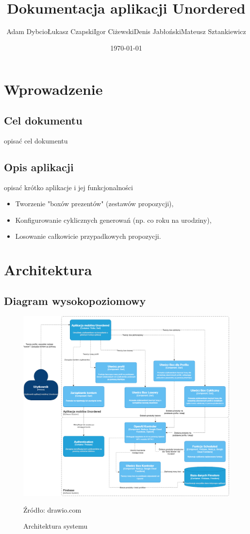 \documentclass[a4paper, 12pt]{article}
\title{Dokumentacja aplikacji Unordered}
\author{Adam Dybcio\endline Łukasz Czapski\endline Igor Ciżewski\endline Denis Jabłoński\endline Mateusz Sztankiewicz}
\date{\today}
\begin{document}
\maketitle
\newpage
\tableofcontents
\newpage

\section{Wprowadzenie}
\subsection{Cel dokumentu}
opisać cel dokumentu

\subsection{Opis aplikacji}
opisać krótko aplikacje i jej funkcjonalności
\begin{itemize}
    \item Tworzenie "boxów prezentów" (zestawów propozycji),
    \item Konfigurowanie cyklicznych generowań (np. co roku na urodziny),
    \item Losowanie całkowicie przypadkowych propozycji.
\end{itemize}

\newpage
\section{Architektura}
\subsection{Diagram wysokopoziomowy}
\begin{figure}[ht]
    \centering
    \includegraphics[width=1\textwidth]{images/unordered.c4.png}
    \caption{Architektura systemu}{Źródło: drawio.com}
    \label{fig:arch}
\end{figure}
\end{document}
